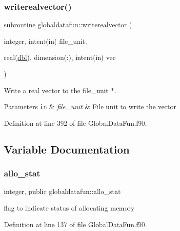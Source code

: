 \subsubsection{\texorpdfstring{writerealvector()}{writerealvector()}}
{\footnotesize\ttfamily subroutine globaldatafun\+::writerealvector (\begin{DoxyParamCaption}\item[{integer, intent(in)}]{file\+\_\+unit,  }\item[{real(\hyperlink{namespaceglobaldatafun_a5008801201dd34f2af8eae07756befb4}{dbl}), dimension(\+:), intent(in)}]{vec }\end{DoxyParamCaption})\hspace{0.3cm}{\ttfamily [private]}}



Write a real vector to the file\+\_\+unit $\ast$. 


\begin{DoxyParams}[1]{Parameters}
\mbox{\tt in}  & {\em file\+\_\+unit} & File unit to write the vector \\
\hline
\end{DoxyParams}


Definition at line 392 of file Global\+Data\+Fun.\+f90.



\subsection{Variable Documentation}
\mbox{\label{namespaceglobaldatafun_ac0c29e0202eb23daead1a4fcecc645ea}} 
\subsubsection{\texorpdfstring{allo\+\_\+stat}{allo\_stat}}
{\footnotesize\ttfamily integer, public globaldatafun\+::allo\+\_\+stat}



flag to indicate status of allocating memory 



Definition at line 137 of file Global\+Data\+Fun.\+f90.

\mbox{\label{namespaceglobaldatafun_ac1ee1084ba0c21ae53df281847753757}} 

